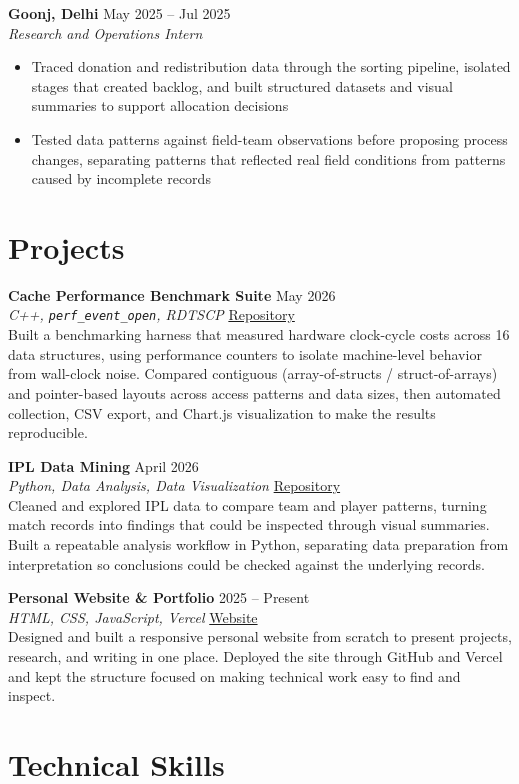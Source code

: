 \documentclass[10pt,a4paper]{article}
\newcommand{\experience}[4]{
    \textbf{#1} \hfill #2\\
    \textit{#3} \hfill #4\\[0.1em]
}
\newcommand{\project}[4]{
    \textbf{#1} \hfill #2\\
    \textit{#3} \hfill #4\\[0.1em]
}
\begin{document}
\experience{Goonj, Delhi}{May 2025 -- Jul 2025}{Research and Operations Intern}{}
\begin{itemize}[leftmargin=*, itemsep=0pt, parsep=0pt, topsep=1pt]
    \item Traced donation and redistribution data through the sorting pipeline, isolated stages that created backlog, and built structured datasets and visual summaries to support allocation decisions
    \item Tested data patterns against field-team observations before proposing process changes, separating patterns that reflected real field conditions from patterns caused by incomplete records
\end{itemize}

\section*{Projects}

\project{Cache Performance Benchmark Suite}{May 2026}{C++, \texttt{perf\_event\_open}, RDTSCP}{\href{https://github.com/notmohsin/Performance-and-Data-Representation}{Repository}}
Built a benchmarking harness that measured hardware clock-cycle costs across 16 data structures, using performance counters to isolate machine-level behavior from wall-clock noise. Compared contiguous (array-of-structs / struct-of-arrays) and pointer-based layouts across access patterns and data sizes, then automated collection, CSV export, and Chart.js visualization to make the results reproducible.

\project{IPL Data Mining}{April 2026}{Python, Data Analysis, Data Visualization}{\href{https://github.com/notmohsin/IPL---Data-Mining}{Repository}}
Cleaned and explored IPL data to compare team and player patterns, turning match records into findings that could be inspected through visual summaries. Built a repeatable analysis workflow in Python, separating data preparation from interpretation so conclusions could be checked against the underlying records.

\project{Personal Website \& Portfolio}{2025 -- Present}{HTML, CSS, JavaScript, Vercel}{\href{https://sheikhmohsin.vercel.app/}{Website}}
Designed and built a responsive personal website from scratch to present projects, research, and writing in one place. Deployed the site through GitHub and Vercel and kept the structure focused on making technical work easy to find and inspect.

\section*{Technical Skills}
\end{document}
